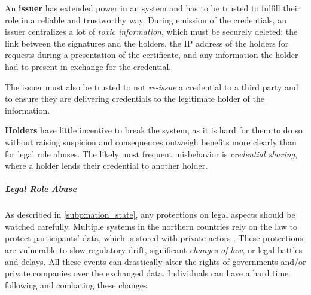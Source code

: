 An \textbf{issuer} has extended power in an \eid system and has to be trusted 
to fulfill their role in a reliable and trustworthy way.
During emission of the credentials, an issuer centralizes a lot of \emph{toxic information}, which must be securely deleted: the link between the signatures and the holders,
the IP address of the holders for requests during a presentation of the certificate, and any information the holder had to present in exchange for the credential.

The issuer must also be trusted to
not \emph{re-issue} a credential to a third party and to ensure they are delivering credentials to the legitimate holder of the information.

\textbf{Holders} have little incentive to break the system, as it is hard for them to do so without raising suspicion and consequences outweigh benefits
more clearly than for legal role abuses.
The likely most frequent misbehavior is \emph{credential sharing}, where a holder lends their credential to another holder.

\subparagraph{Legal Role Abuse}

As described in \ref{subp:nation_state}, any protections on legal aspects should be watched carefully.
Multiple \eid systems in the northern countries rely on the law to protect participants'
data, which is stored with private actors \cite{BankID25}.
These protections are vulnerable to slow regulatory drift, significant \emph{changes of law}, or legal battles and delays.
All these events can drastically alter the rights of governments and/or private companies over the exchanged data.
Individuals can have a hard time following and combating these changes.


